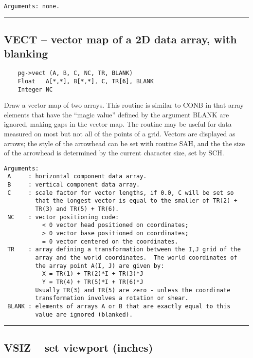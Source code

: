 \begin{verbatim}
Arguments: none.
\end{verbatim}

\hrule

\subsection*{VECT -- vector map of a 2D data array, with blanking }

\begin{verbatim}
    pg->vect (A, B, C, NC, TR, BLANK)
    Float   A[*,*], B[*,*], C, TR[6], BLANK
    Integer NC
\end{verbatim}

Draw a vector map of two arrays.  This routine is similar to CONB in
that array elements that have the ``magic value'' defined by the
argument BLANK are ignored, making gaps in the vector map.  The
routine may be useful for data measured on most but not all of the
points of a grid.  Vectors are displayed as arrows; the style of the
arrowhead can be set with routine SAH, and the the size of the
arrowhead is determined by the current character size, set by SCH.

\begin{verbatim}
Arguments:
 A     : horizontal component data array.
 B     : vertical component data array.
 C     : scale factor for vector lengths, if 0.0, C will be set so
         that the longest vector is equal to the smaller of TR(2) +
         TR(3) and TR(5) + TR(6).  
 NC    : vector positioning code:
           < 0 vector head positioned on coordinates;
           > 0 vector base positioned on coordinates;
           = 0 vector centered on the coordinates.
 TR    : array defining a transformation between the I,J grid of the
         array and the world coordinates.  The world coordinates of
         the array point A(I, J) are given by:
           X = TR(1) + TR(2)*I + TR(3)*J
           Y = TR(4) + TR(5)*I + TR(6)*J
         Usually TR(3) and TR(5) are zero - unless the coordinate
         transformation involves a rotation or shear.
 BLANK : elements of arrays A or B that are exactly equal to this
         value are ignored (blanked). 
\end{verbatim}

\hrule

\subsection*{VSIZ -- set viewport (inches) }

